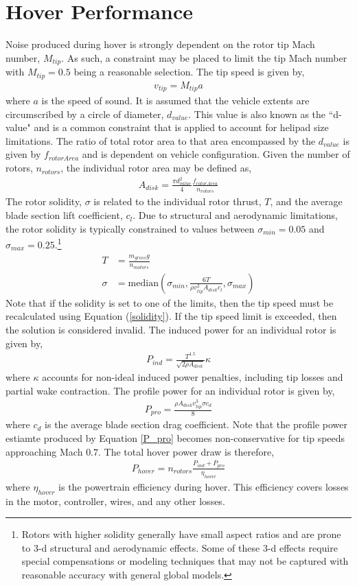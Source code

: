 \documentclass[12pt, letter]{article}
\begin{document}
\section{Hover Performance}
Noise produced during hover is strongly dependent on the rotor tip Mach number, $M_{tip}$. As such, a constraint may be placed to limit the tip Mach number with $M_{tip}=0.5$ being a reasonable selection. The tip speed is given by,
\begin{align}
	v_{tip}=M_{tip}a
\end{align}
where $a$ is the speed of sound. It is assumed that the vehicle extents are circumscribed by a circle of diameter, $d_{value}$. This value is also known as the ``d-value" and is a common constraint that is applied to account for helipad size limitations. The ratio of total rotor area to that area encompassed by the $d_{value}$ is given by $f_{rotorArea}$ and is dependent on vehicle configuration. Given the number of rotors, $n_{rotors}$, the individual rotor area may be defined as,
\begin{align}
	A_{disk}=\frac{\pi d_{value}^2}{4} \frac{f_{rotorArea}}{n_{rotors}}
\end{align}
The rotor solidity, $\sigma$ is related to the individual rotor thrust, $T$, and the average blade section lift coefficient, $c_l$. Due to structural and aerodynamic limitations, the rotor solidity is typically constrained to values between $\sigma_{min}=0.05$ and $\sigma_{max}=0.25$.\footnote{Rotors with higher solidity generally have small aspect ratios and are prone to 3-d structural and aerodynamic effects. Some of these 3-d effects require special compensations or modeling techniques that may not be captured with reasonable accuracy with general global models.}
\begin{align}
	T&=\frac{m_{gross}g}{n_{motors}}\\
	\sigma&=\text{median}\left(\sigma_{min},\frac{6T}{\rho v_{tip}^2 A_{disk} c_l},\sigma_{max}\right) \label{solidity}
\end{align}
Note that if the solidity is set to one of the limits, then the tip speed must be recalculated using Equation (\ref{solidity}). If the tip speed limit is exceeded, then the solution is considered invalid. The induced power for an individual rotor is given by,
\begin{align}
	P_{ind}=\frac{T^{1.5}}{\sqrt{2 \rho A_{disk}}} \kappa
\end{align}
where $\kappa$ accounts for non-ideal induced power penalties, including tip losses and partial wake contraction. The profile power for an individual rotor is given by,
\begin{align}
	P_{pro}=\frac{\rho A_{disk} v_{tip}^3 \sigma c_d}{8} \label{P_pro}
\end{align}
where $c_d$ is the average blade section drag coefficient. Note that the profile power estiamte produced by Equation \ref{P_pro} becomes non-conservative for tip speeds approaching Mach $0.7$. The total hover power draw is therefore,
\begin{align}
	P_{hover}=n_{rotors} \frac{P_{ind}+P_{pro}}{\eta_{hover}}
\end{align}
where $\eta_{hover}$ is the powertrain efficiency during hover. This efficiency covers losses in the motor, controller, wires, and any other losses.
\end{document}
